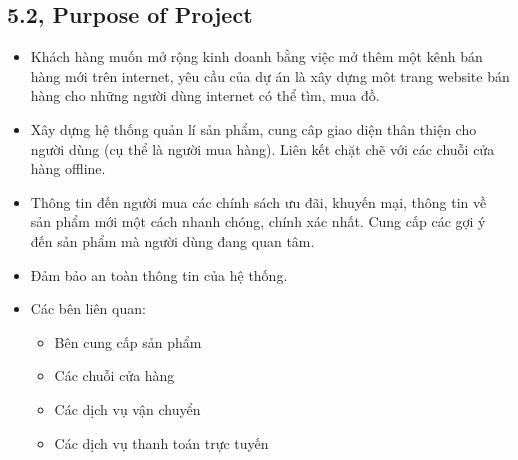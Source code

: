 \documentclass[a4paper,11pt]{report}
\begin{document}
\subsection*{5.2, Purpose of Project}
\begin{itemize}
\item Khách hàng muốn mở rộng kinh doanh bằng việc mở thêm một kênh bán hàng mới trên internet, yêu cầu của dự án là xây dựng môt trang website bán hàng cho những người dùng internet có thể tìm, mua đồ.
\item Xây dựng hệ thống quản lí sản phẩm, cung câp giao diện thân thiện cho người dùng (cụ thể là người mua hàng). Liên kết chặt chẽ với các chuỗi cửa hàng offline.
\item Thông tin đến người mua các chính sách ưu đãi, khuyến mại, thông tin về sản phẩm mới một cách nhanh chóng, chính xác nhất.
Cung cấp các gợi ý đến sản phẩm mà người dùng đang quan tâm.
\item Đảm bảo an toàn thông tin của hệ thống.
\item Các bên liên quan:
\begin{itemize}
\item Bên cung cấp sản phẩm
\item Các chuỗi cửa hàng
\item Các dịch vụ vận chuyển
\item Các dịch vụ thanh toán trực tuyến
\end{itemize}
\end{itemize}
\end{document}
